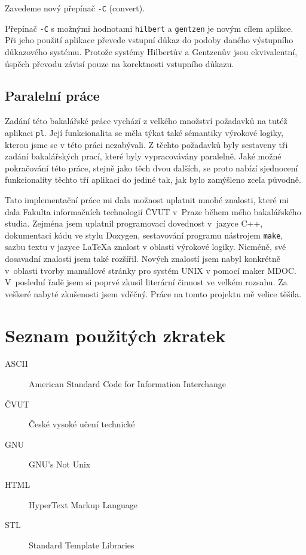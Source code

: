 \documentclass[thesis=B,czech,hidelinks]{thesis}[2012/06/26]
\begin{document}
Zavedeme nový přepínač \texttt{-C} (convert).

Přepínač \texttt{-C} s možnými hodnotami \texttt{hilbert} a \texttt{gentzen} je novým cílem aplikce. Při jeho použití aplikace převede vstupní důkaz do podoby daného výstupního důkazového systému. Protože systémy Hilbertův a Gentzenův jsou ekvivalentní, úspěch převodu závisí pouze na korektnosti vstupního důkazu.

\section{Paralelní práce}

Zadání této bakalářské práce vychází z velkého množství požadavků na tutéž aplikaci \texttt{pl}. Její funkcionalita se měla týkat také sémantiky výrokové logiky, kterou jsme se v této práci nezabývali. Z těchto požadavků byly sestaveny tři zadání bakalářských prací, které byly vypracovávány paralelně. Jaké možné pokračování této práce, stejně jako těch dvou dalších, se proto nabízí sjednocení funkcionality těchto tří aplikaci do jediné tak, jak bylo zamýšleno zcela původně.

%
%
%

\begin{conclusion}
Tato implementační práce mi dala možnost uplatnit mnohé znalosti, které mi dala Fakulta informačních technologií ČVUT v~Praze během mého bakalářského studia. Zejména jsem uplatnil programovací dovednost v~jazyce C++, dokumentaci kódu ve stylu Doxygen, sestavování programu nástrojem \texttt{make}, sazbu textu v jazyce \LaTeX a znalost v oblasti výrokové logiky. Nicméně, své dosavadní znalosti jsem také rozšířil. Nových znalostí jsem nabyl konkrétně v~oblasti tvorby manuálové stránky pro systém UNIX v pomocí maker MDOC. V~poslední řadě jsem si poprvé zkusil literární činnost ve velkém rozsahu. Za veškeré nabyté zkušenosti jsem vděčný. Práce na tomto projektu mě velice těšila.
\end{conclusion}

%
%
%




\appendix

%
%
%

\chapter{Seznam použitých zkratek}

\begin{description}
	\item[ASCII] American Standard Code for Information Interchange
	\item[ČVUT] České vysoké učení technické
	\item[GNU] GNU's Not Unix
	\item[HTML] HyperText Markup Language
	\item[STL] Standard Template Libraries
\end{description}
\end{document}
